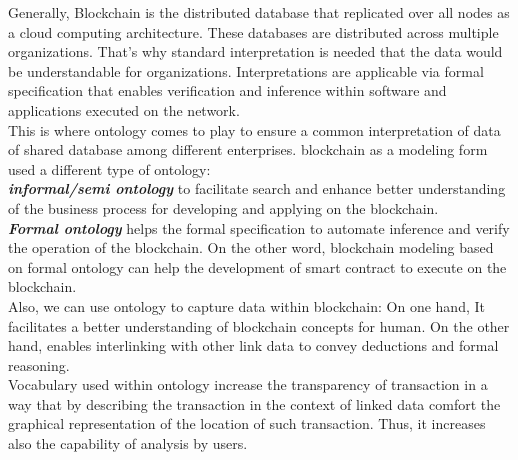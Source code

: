 Generally, Blockchain is the distributed database that replicated over all nodes as a cloud computing architecture. These databases are distributed across multiple organizations. That's why standard interpretation is needed that the data would be understandable for organizations. Interpretations are applicable via formal specification that enables verification and inference within software and applications executed on the network. \\
This is where ontology comes to play to ensure a common interpretation of data of shared database among different enterprises.
blockchain as a modeling form used a different type of ontology: \\
\textbf{\textit{informal/semi ontology}} to facilitate search and enhance better understanding of the business process for developing and applying on the blockchain.\\
\textbf{\textit{Formal ontology}} helps the formal specification to automate inference and verify the operation of the blockchain. On the other word, blockchain modeling based on formal ontology can help the development of smart contract to execute on the blockchain.\\
Also, we can use ontology to capture data within blockchain: On one hand, It facilitates a better understanding of blockchain concepts for human. On the other hand, enables interlinking with other link data to convey deductions and formal reasoning\cite{Matthew}.\\
Vocabulary used within ontology increase the transparency of transaction in a way that by describing the transaction in the context of linked data comfort the graphical representation of the location of such transaction. Thus, it increases also the capability of analysis by users.


